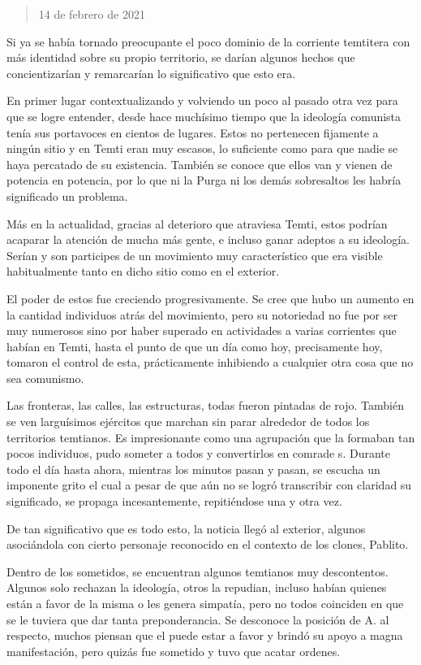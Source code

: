 \documentclass[
]{book}
\begin{document}
\begin{quote}
14 de febrero de 2021
\end{quote}

Si ya se había tornado preocupante el poco dominio de la corriente temtitera con más identidad sobre su propio territorio, se darían algunos hechos que concientizarían y remarcarían lo significativo que esto era.

En primer lugar contextualizando y volviendo un poco al pasado otra vez para que se logre entender, desde hace muchísimo tiempo que la ideología comunista tenía sus portavoces en cientos de lugares. Estos no pertenecen fijamente a ningún sitio y en Temti eran muy escasos, lo suficiente como para que nadie se haya percatado de su existencia. También se conoce que ellos van y vienen de potencia en potencia, por lo que ni la Purga ni los demás sobresaltos les habría significado un problema.

Más en la actualidad, gracias al deterioro que atraviesa Temti, estos podrían acaparar la atención de mucha más gente, e incluso ganar adeptos a su ideología. Serían y son participes de un movimiento muy característico que era visible habitualmente tanto en dicho sitio como en el exterior.

El poder de estos fue creciendo progresivamente. Se cree que hubo un aumento en la cantidad individuos atrás del movimiento, pero su notoriedad no fue por ser muy numerosos sino por haber superado en actividades a varias corrientes que habían en Temti, hasta el punto de que un día como hoy, precisamente hoy, tomaron el control de esta, prácticamente inhibiendo a cualquier otra cosa que no sea comunismo.

Las fronteras, las calles, las estructuras, todas fueron pintadas de rojo. También se ven larguísimos ejércitos que marchan sin parar alrededor de todos los territorios temtianos. Es impresionante como una agrupación que la formaban tan pocos individuos, pudo someter a todos y convertirlos en comrade s. Durante todo el día hasta ahora, mientras los minutos pasan y pasan, se escucha un imponente grito el cual a pesar de que aún no se logró transcribir con claridad su significado, se propaga incesantemente, repitiéndose una y otra vez.

De tan significativo que es todo esto, la noticia llegó al exterior, algunos asociándola con cierto personaje reconocido en el contexto de los clones, Pablito.

Dentro de los sometidos, se encuentran algunos temtianos muy descontentos. Algunos solo rechazan la ideología, otros la repudian, incluso habían quienes están a favor de la misma o les genera simpatía, pero no todos coinciden en que se le tuviera que dar tanta preponderancia. Se desconoce la posición de A. al respecto, muchos piensan que el puede estar a favor y brindó su apoyo a magna manifestación, pero quizás fue sometido y tuvo que acatar ordenes.
\end{document}
